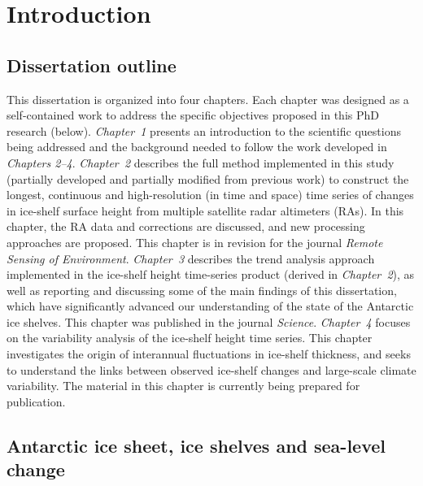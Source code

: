 


\chapter{Introduction}

\section{Dissertation outline}

This dissertation is organized into four chapters. Each chapter was designed as a self-contained work to address the specific objectives proposed in this PhD research (below). {\sl Chapter~1} presents an introduction to the scientific questions being addressed and the background needed to follow the work developed in {\sl Chapters 2--4}. {\sl Chapter~2} describes the full method implemented in this study (partially developed and partially modified from previous work) to construct the longest, continuous and high-resolution (in time and space) time series of changes in ice-shelf surface height from multiple satellite radar altimeters (RAs). In this chapter, the RA data and corrections are discussed, and new processing approaches are proposed. This chapter is in revision for the journal {\it Remote Sensing of Environment}. {\sl Chapter~3} describes the trend analysis approach implemented in the ice-shelf height time-series product (derived in {\sl Chapter~2}), as well as reporting and discussing some of the main findings of this dissertation, which have significantly advanced our understanding of the state of the Antarctic ice shelves. This chapter was published in the journal {\it Science}. {\sl Chapter~4} focuses on the variability analysis of the ice-shelf height time series. This chapter investigates the origin of interannual fluctuations in ice-shelf thickness, and seeks to understand the links between observed ice-shelf changes and large-scale climate variability. The material in this chapter is currently being prepared for publication.


\section{Antarctic ice sheet, ice shelves and sea-level change}

